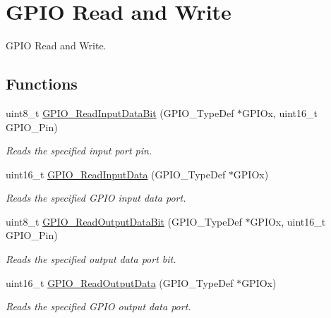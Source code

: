 \hypertarget{group___g_p_i_o___group2}{}\section{G\+P\+IO Read and Write}
\label{group___g_p_i_o___group2}


G\+P\+IO Read and Write.  


\subsection*{Functions}
\begin{DoxyCompactItemize}
\item 
uint8\+\_\+t \mbox{\hyperlink{group___g_p_i_o___group2_ga98772ef6b639b3fa06c8ae5ba28d3aaa}{G\+P\+I\+O\+\_\+\+Read\+Input\+Data\+Bit}} (G\+P\+I\+O\+\_\+\+Type\+Def $\ast$G\+P\+I\+Ox, uint16\+\_\+t G\+P\+I\+O\+\_\+\+Pin)
\begin{DoxyCompactList}\small\item\em Reads the specified input port pin. \end{DoxyCompactList}\item 
uint16\+\_\+t \mbox{\hyperlink{group___g_p_i_o___group2_ga139a33adc8409288e9f193bbebb5a0f7}{G\+P\+I\+O\+\_\+\+Read\+Input\+Data}} (G\+P\+I\+O\+\_\+\+Type\+Def $\ast$G\+P\+I\+Ox)
\begin{DoxyCompactList}\small\item\em Reads the specified G\+P\+IO input data port. \end{DoxyCompactList}\item 
uint8\+\_\+t \mbox{\hyperlink{group___g_p_i_o___group2_ga138270f8695b105b7c6ed405792919c1}{G\+P\+I\+O\+\_\+\+Read\+Output\+Data\+Bit}} (G\+P\+I\+O\+\_\+\+Type\+Def $\ast$G\+P\+I\+Ox, uint16\+\_\+t G\+P\+I\+O\+\_\+\+Pin)
\begin{DoxyCompactList}\small\item\em Reads the specified output data port bit. \end{DoxyCompactList}\item 
uint16\+\_\+t \mbox{\hyperlink{group___g_p_i_o___group2_gaf8938a34280b7dc3e39872a7c17bb323}{G\+P\+I\+O\+\_\+\+Read\+Output\+Data}} (G\+P\+I\+O\+\_\+\+Type\+Def $\ast$G\+P\+I\+Ox)
\begin{DoxyCompactList}\small\item\em Reads the specified G\+P\+IO output data port. \end{DoxyCompactList}\item 

\end{DoxyCompactItemize}
